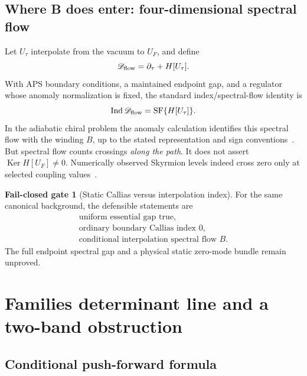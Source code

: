 \documentclass[11pt]{article}
\theoremstyle{definition}
\newtheorem{gate}[theorem]{Fail-closed gate}
\theoremstyle{remark}
\newcommand{\Ind}{\operatorname{Ind}}
\newcommand{\Ker}{\operatorname{Ker}}
\newcommand{\SF}{\operatorname{SF}}
\begin{document}
\subsection{Where B does enter: four-dimensional spectral flow}

Let \(U_\tau\) interpolate from the vacuum to \(U_F\), and define
\begin{equation}
 \mathscr D_{\rm flow}=\partial_\tau+H[U_\tau].
 \label{eq:flow-operator}
\end{equation}
With APS boundary conditions, a maintained endpoint gap, and a regulator
whose anomaly normalization is fixed, the standard index/spectral-flow
identity is
\begin{equation}
 \Ind\mathscr D_{\rm flow}=\SF\{H[U_\tau]\}.
 \label{eq:index-sf}
\end{equation}
In the adiabatic chiral problem the anomaly calculation identifies this
spectral flow with the winding \(B\), up to the stated representation and sign
conventions~\cite{APS1975APE6,GoldstoneWilczek1981APE6}.  But spectral flow
counts crossings \emph{along the path}.  It does not assert
\(\Ker H[U_F]\ne0\).  Numerically observed Skyrmion levels indeed cross zero
only at selected coupling values~\cite{DzhunushalievEtAl2024APE6}.

\begin{gate}[Static Callias versus interpolation index]
For the same canonical background, the defensible statements are
\[
 \begin{gathered}
 \text{uniform essential gap true},\\
 \text{ordinary boundary Callias index }0,\\
 \text{conditional interpolation spectral flow }B.
 \end{gathered}
\]
The full endpoint spectral gap and a physical static zero-mode bundle remain
unproved.
\end{gate}

\section{Families determinant line and a two-band obstruction}

\subsection{Conditional push-forward formula}
\end{document}
